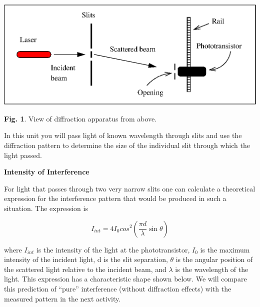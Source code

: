 \vspace{0.3cm}
\begin{center}
\includegraphics{interference_of_light_fig1b.eps}
\end{center}
\vspace{0.3cm}

{\centering \textbf{Fig. 1}. View of diffraction apparatus from above.\par}

In this unit you will  pass light of known wavelength through slits 
and use the diffraction pattern to determine the size of the individual
slit through which the light passed.

\textbf{Intensity of Interference }

For light that passes through two very narrow slits one can calculate
a theoretical expression for the interference pattern that would be
produced in such a situation. The expression is 

\begin{displaymath} I_{int} = 4I_0 cos^2 (\frac {\pi d} {\lambda} \sin \theta ) \end{displaymath}

where $I_{int}$ is the intensity of the light at the phototransistor,
$I_{0}$ is the maximum intensity of the incident light, d is
the slit separation, \( \theta  \) is the angular position of the
scattered light relative to the incident beam, and \( \lambda  \)
is the wavelength of the light. This expression has a characteristic
shape shown below. We will compare this prediction of {}``pure''
interference (without diffraction effects) with the measured pattern
in the next activity.

